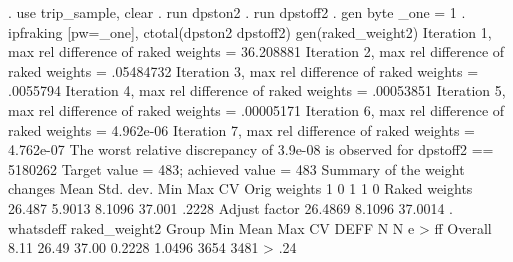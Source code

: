 . use trip_sample, clear
{\smallskip}
. run dpston2
{\smallskip}
. run dpstoff2
{\smallskip}
. gen byte _one = 1       
{\smallskip}
. ipfraking [pw=_one], ctotal(dpston2 dpstoff2) gen(raked_weight2)
{\smallskip}
 Iteration 1, max rel difference of raked weights = 36.208881
 Iteration 2, max rel difference of raked weights = .05484732
 Iteration 3, max rel difference of raked weights = .0055794
 Iteration 4, max rel difference of raked weights = .00053851
 Iteration 5, max rel difference of raked weights = .00005171
 Iteration 6, max rel difference of raked weights = 4.962e-06
 Iteration 7, max rel difference of raked weights = 4.762e-07
The worst relative discrepancy of  3.9e-08 is observed for dpstoff2 == 5180262     
Target value =        483; achieved value =        483
{\smallskip}
   Summary of the weight changes
{\smallskip}
              {\VBAR}    Mean    Std. dev.    Min        Max       CV
Orig weights  {\VBAR}        1          0         1           1       0
Raked weights {\VBAR}   26.487     5.9013    8.1096      37.001   .2228
Adjust factor {\VBAR}  26.4869               8.1096     37.0014
{\smallskip}
. whatsdeff raked_weight2
{\smallskip}
    Group     {\VBAR}   Min     {\VBAR}   Mean    {\VBAR}   Max     {\VBAR}    CV   {\VBAR}   DEFF  {\VBAR}   N   {\VBAR}  N e
> ff
      Overall {\VBAR}      8.11 {\VBAR}     26.49 {\VBAR}     37.00 {\VBAR}  0.2228 {\VBAR}  1.0496 {\VBAR}  3654 {\VBAR} 3481
> .24
{\smallskip}
